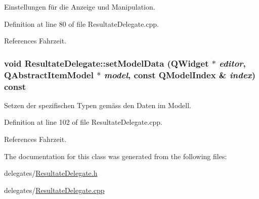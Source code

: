 Einstellungen für die Anzeige und Manipulation. 



Definition at line 80 of file ResultateDelegate.cpp.

References Fahrzeit.\hypertarget{class_resultate_delegate_b005b8316a221b63baf1f6a153b74e35}{
\subsubsection[setModelData]{\setlength{\rightskip}{0pt plus 5cm}void ResultateDelegate::setModelData (QWidget $\ast$ {\em editor}, \/  QAbstractItemModel $\ast$ {\em model}, \/  const QModelIndex \& {\em index}) const}}
\label{class_resultate_delegate_b005b8316a221b63baf1f6a153b74e35}


Setzen der spezifischen Typen gemäss den Daten im Modell. 



Definition at line 102 of file ResultateDelegate.cpp.

References Fahrzeit.

The documentation for this class was generated from the following files:\begin{CompactItemize}
\item 
delegates/\hyperlink{_resultate_delegate_8h}{ResultateDelegate.h}\item 
delegates/\hyperlink{_resultate_delegate_8cpp}{ResultateDelegate.cpp}\end{CompactItemize}
